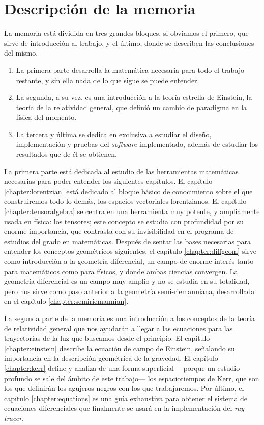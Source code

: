 \section*{Descripción de la memoria}

La memoria está dividida en tres grandes bloques, si obviamos el primero, que sirve de introducción al trabajo, y el último, donde se describen las conclusiones del mismo.

\begin{enumerate}
	\item La primera parte desarrolla la matemática necesaria para todo el trabajo restante, y sin ella nada de lo que sigue se puede entender.
	\item La segunda, a su vez, es una introducción a la teoría estrella de Einstein, la teoría de la relatividad general, que definió un cambio de paradigma en la física del momento.
	\item La tercera y última se dedica en exclusiva a estudiar el diseño, implementación y pruebas del \emph{software} implementado, además de estudiar los resultados que de él se obtienen.
\end{enumerate}

La primera parte está dedicada al estudio de las herramientas matemáticas necesarias para poder entender los siguientes capítulos. El capítulo \ref{chapter:lorentzian} está dedicado al bloque básico de conocimiento sobre el que construiremos todo lo demás, los espacios vectoriales lorentzianos. El capítulo \ref{chapter:tensoralgebra} se centra en una herramienta muy potente, y ampliamente usada en física: los tensores; este concepto se estudia con profundidad por su enorme importancia, que contrasta con su invisibilidad en el programa de estudios del grado en matemáticas. Después de sentar las bases necesarias para entender los conceptos geométricos siguientes, el capítulo \ref{chapter:diffgeom} sirve como introducción a la geometría diferencial, un campo de enorme interés tanto para matemáticos como para físicos, y donde ambas ciencias convergen. La geometría diferencial es un campo muy amplio y no se estudia en su totalidad, pero nos sirve como paso anterior a la geometría semi-riemanniana, desarrollada en el capítulo \ref{chapter:semiriemannian}.

La segunda parte de la memoria es una introducción a los conceptos de la teoría de relatividad general que nos ayudarán a llegar a las ecuaciones para las trayectorias de la luz que buscamos desde el principio. El capítulo \ref{chapter:einstein} describe la ecuación de campo de Einstein, señalando su importancia en la descripción geométrica de la gravedad. El capítulo \ref{chapter:kerr} define y analiza de una forma superficial ---porque un estudio profundo se sale del ámbito de este trabajo--- los espaciotiempos de Kerr, que son los que definirán los agujeros negros con los que trabajaremos. Por último, el capítulo \ref{chapter:equations} es una guía exhaustiva para obtener el sistema de ecuaciones diferenciales que finalmente se usará en la implementación del \emph{ray tracer}.

